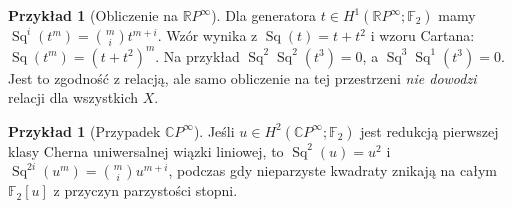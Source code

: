 \documentclass[11pt,a4paper,oneside]{report}
\newcommand{\F}{\mathbb{F}}
\theoremstyle{plain}
\theoremstyle{definition}
\newtheorem{przyklad}[twierdzenie]{Przykład}
\theoremstyle{remark}
\begin{document}
\begin{przyklad}[Obliczenie na $\mathbb RP^{\infty}$]
Dla generatora $t\in H^1(\mathbb RP^\infty;\F_2)$ mamy
$\operatorname{Sq}^i(t^m)=\binom mi t^{m+i}$.
Wzór wynika z $\operatorname{Sq}(t)=t+t^2$ i
wzoru Cartana: $\operatorname{Sq}(t^m)=(t+t^2)^m$.
Na przykład
$\operatorname{Sq}^2\operatorname{Sq}^2(t^3)=0$,
a $\operatorname{Sq}^3\operatorname{Sq}^1(t^3)=0$.
Jest to zgodność z relacją, ale samo obliczenie na tej
przestrzeni \emph{nie dowodzi} relacji dla wszystkich $X$.
\end{przyklad}
\begin{przyklad}[Przypadek $\mathbb CP^\infty$]
Jeśli $u\in H^2(\mathbb CP^\infty;\F_2)$ jest redukcją
pierwszej klasy Cherna uniwersalnej wiązki liniowej, to
$\operatorname{Sq}^2(u)=u^2$ i
$\operatorname{Sq}^{2i}(u^m)=\binom mi u^{m+i}$,
podczas gdy nieparzyste kwadraty znikają na całym
$\F_2[u]$ z przyczyn parzystości stopni.
\end{przyklad}
\end{document}
